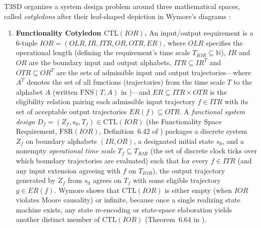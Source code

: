 T3SD organizes a system design problem around three mathematical spaces, called \emph{cotyledons} after their leaf-shaped depiction in Wymore's diagrams \citep{Wymore1993}:
\begin{enumerate}
    \item \textbf{Functionality Cotyledon $\mathrm{CTL}(IOR)$.} An input/output requirement is a 6-tuple $IOR=(OLR,IR,ITR,OR,OTR,ER)$, where $OLR$ specifies the operational length (defining the requirement's time scale $T_{IOR}\subseteq\mathbb{N}$), $IR$ and $OR$ are the boundary input and output alphabets, $ITR\subseteq IR^T$ and $OTR\subseteq OR^T$ are the sets of admissible input and output trajectories---where $A^T$ denotes the set of all functions (trajectories) from the time scale $T$ to the alphabet $A$ (written $\mathrm{FNS}(T,A)$ in \citet{Wymore1993})---and $ER\subseteq ITR\times OTR$ is the eligibility relation pairing each admissible input trajectory $f\in ITR$ with its set of acceptable output trajectories $ER(f)\subseteq OTR$. A \emph{functional system design} $D_f=(Z_f,s_0,T_f)\in\mathrm{CTL}(IOR)$ (the Functionality Space Requirement, $\mathrm{FSR}(IOR)$, Definition~6.42 of \citet{Wymore1993}) packages a discrete system $Z_f$ on boundary alphabets $(IR,OR)$, a designated initial state $s_0$, and a nonempty \emph{operational time scale} $T_f\subseteq T_{IOR}$ (the set of discrete clock ticks over which boundary trajectories are evaluated) such that for every $f\in ITR$ (and any input extension agreeing with $f$ on $T_{IOR}$), the output trajectory generated by $Z_f$ from $s_0$ agrees on $T_f$ with some eligible trajectory $g\in ER(f)$. Wymore shows that $\mathrm{CTL}(IOR)$ is either empty (when $IOR$ violates Moore causality) or infinite, because once a single realizing state machine exists, any state re-encoding or state-space elaboration yields another distinct member of $\mathrm{CTL}(IOR)$ (Theorem~6.64 in \citet{Wymore1993}).

\end{enumerate}
